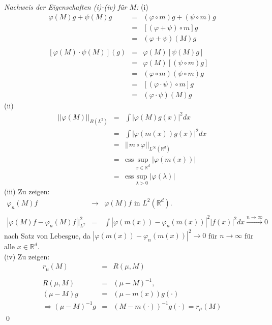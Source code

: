 \documentclass[12pt]{extreport} %
\numberwithin{equation}{section}
\newcommand{\R}{\mathbb{R}} %
\newcommand{\m}{\cdot}
\begin{document}
	\emph{Nachweis der Eigenschaften (i)-(iv) für $M$:} (i)
	\begin{eqnarray}
		\varphi(M)g +\psi(M)g &=& (\varphi\circ m)g+(\psi\circ m)g\nonumber\\
		&=& \left[(\varphi+\psi)\circ m \right]g \nonumber\\
		&=& (\varphi+\psi)(M)g\nonumber\\ \nonumber\\
		\left[\varphi(M)\m \psi(M) \right](g) &=& \varphi(M)\left[\psi(M)g \right]\nonumber\\
		&=& \varphi(M)\left[(\psi\circ m)g \right]\nonumber\\
		&=& (\varphi\circ m)(\psi\circ m)g\nonumber\\
		&=& \left[(\varphi\m \psi)\circ m\right] g\nonumber\\
		&=& (\varphi\m \psi)(M)g\nonumber
	\end{eqnarray}
	(ii)
	\begin{eqnarray}
		||\varphi(M)||_{B(L^2)} &=& \int |\varphi(M)g(x)|^2 dx\nonumber\\
		&=& \int|\varphi(m(x))g(x)|^2dx\nonumber\\
		&=& ||m\circ\varphi||_{L^\infty(\R^d)}\nonumber\\
		&=& \text{ess}\sup_{x\in \R^d}|\varphi(m(x))|\nonumber\\
		&=& \text{ess}\sup_{\lambda>0}|\varphi(\lambda)|\nonumber
	\end{eqnarray}
	(iii) Zu zeigen:
	\begin{eqnarray}
		\varphi_n(M)f &\rightarrow& \varphi(M)f\text{ in } L^2(\R^d).\nonumber\\
		\nonumber\\
		|\varphi(M)f-\varphi_n(M)f||_{L^2}^2 &=&\int |\varphi(m(x)) - \varphi_n(m(x))|^2 |f(x)|^2 dx\overset{n\rightarrow \infty}{\longrightarrow} 0\nonumber
	\end{eqnarray}
	nach Satz von Lebesgue, da $|\varphi(m(x)) - \varphi_n(m(x))|^2\rightarrow 0$ für $n\rightarrow\infty$ für alle $x\in \R^d$.\\
	(iv) Zu zeigen:
	\begin{eqnarray}
		r_\mu(M) &=& R(\mu, M)\nonumber\\
		\nonumber\\
		R(\mu,M)&=& (\mu-M)^{-1},\nonumber\\
		(\mu-M)g&=& (\mu-m(x))g(\m)\nonumber\\
		\Rightarrow (\mu-M)^{-1}g &=& (M-m(\m))^{-1}g(\m) = r_\mu(M)\nonumber
	\end{eqnarray}
	\qed
	
\end{document}
